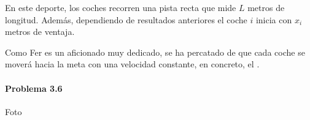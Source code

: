 En este deporte, los coches recorren una pista recta que mide \(L\) metros de longitud. Además, dependiendo de resultados anteriores el coche \(i\) inicia con \(x_i\) metros de ventaja.

Como Fer es un aficionado muy dedicado, se ha percatado de que cada coche se moverá hacia la meta con una velocidad constante, en concreto, el .

\problembreak

\paragraph{Problema 3.6} Foto

